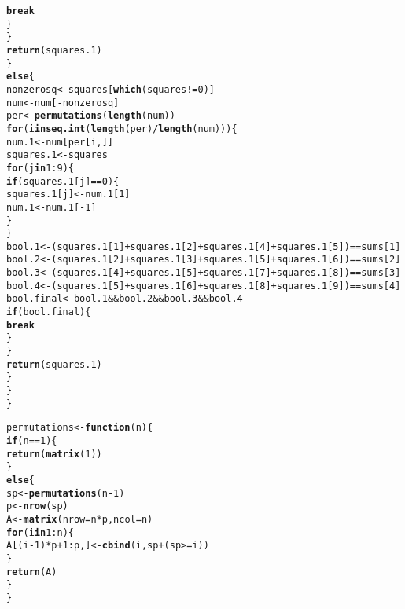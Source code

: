 \documentclass[12pt]{article}\usepackage[]{graphicx}\usepackage[]{color}
\makeatletter
\newcommand{\hlnum}[1]{\textcolor[rgb]{0.686,0.059,0.569}{#1}}%
\newcommand{\hlopt}[1]{\textcolor[rgb]{0,0,0}{#1}}%
\newcommand{\hlstd}[1]{\textcolor[rgb]{0.345,0.345,0.345}{#1}}%
\newcommand{\hlkwa}[1]{\textcolor[rgb]{0.161,0.373,0.58}{\textbf{#1}}}%
\newcommand{\hlkwb}[1]{\textcolor[rgb]{0.69,0.353,0.396}{#1}}%
\newcommand{\hlkwc}[1]{\textcolor[rgb]{0.333,0.667,0.333}{#1}}%
\newcommand{\hlkwd}[1]{\textcolor[rgb]{0.737,0.353,0.396}{\textbf{#1}}}%
\newenvironment{kframe}{%
 \def\at@end@of@kframe{}%
 \ifinner\ifhmode%
  \def\at@end@of@kframe{\end{minipage}}%
  \begin{minipage}{\columnwidth}%
 \fi\fi%
 \def\FrameCommand##1{\hskip\@totalleftmargin \hskip-\fboxsep
 \colorbox{shadecolor}{##1}\hskip-\fboxsep
     \hskip-\linewidth \hskip-\@totalleftmargin \hskip\columnwidth}%
 \MakeFramed {\advance\hsize-\width
   \@totalleftmargin\z@ \linewidth\hsize
   \@setminipage}}%
 {\par\unskip\endMakeFramed%
 \at@end@of@kframe}
\newenvironment{knitrout}{}{} %
\makeatother
\begin{document}
\begin{knitrout}
\begin{kframe}
\begin{alltt}
          \hlkwa{break}
        \hlstd{\}}
      \hlstd{\}}
      \hlkwd{return}\hlstd{(squares.1)}
    \hlstd{\}}
    \hlkwa{else}\hlstd{\{}
      \hlstd{nonzerosq} \hlkwb{<-} \hlstd{squares[}\hlkwd{which}\hlstd{(squares}\hlopt{!=}\hlnum{0}\hlstd{)]}
      \hlstd{num} \hlkwb{<-} \hlstd{num[}\hlopt{-}\hlstd{nonzerosq]}
      \hlstd{per} \hlkwb{<-} \hlkwd{permutations}\hlstd{(}\hlkwd{length}\hlstd{(num))}
      \hlkwa{for} \hlstd{(i} \hlkwa{in} \hlkwd{seq.int}\hlstd{(}\hlkwd{length}\hlstd{(per)}\hlopt{/}\hlkwd{length}\hlstd{(num)))\{}
        \hlstd{num.1} \hlkwb{<-} \hlstd{num[per[i,]]}
        \hlstd{squares.1} \hlkwb{<-} \hlstd{squares}
        \hlkwa{for} \hlstd{(j} \hlkwa{in} \hlnum{1}\hlopt{:}\hlnum{9}\hlstd{)\{}
          \hlkwa{if} \hlstd{(squares.1[j]}\hlopt{==}\hlnum{0}\hlstd{)\{}
            \hlstd{squares.1[j]} \hlkwb{<-} \hlstd{num.1[}\hlnum{1}\hlstd{]}
            \hlstd{num.1} \hlkwb{<-} \hlstd{num.1[}\hlopt{-}\hlnum{1}\hlstd{]}
          \hlstd{\}}
        \hlstd{\}}
        \hlstd{bool.1} \hlkwb{<-} \hlstd{(squares.1[}\hlnum{1}\hlstd{]}\hlopt{+}\hlstd{squares.1[}\hlnum{2}\hlstd{]}\hlopt{+}\hlstd{squares.1[}\hlnum{4}\hlstd{]}\hlopt{+}\hlstd{squares.1[}\hlnum{5}\hlstd{])}\hlopt{==}\hlstd{sums[}\hlnum{1}\hlstd{]}
        \hlstd{bool.2} \hlkwb{<-} \hlstd{(squares.1[}\hlnum{2}\hlstd{]}\hlopt{+}\hlstd{squares.1[}\hlnum{3}\hlstd{]}\hlopt{+}\hlstd{squares.1[}\hlnum{5}\hlstd{]}\hlopt{+}\hlstd{squares.1[}\hlnum{6}\hlstd{])}\hlopt{==}\hlstd{sums[}\hlnum{2}\hlstd{]}
        \hlstd{bool.3} \hlkwb{<-} \hlstd{(squares.1[}\hlnum{4}\hlstd{]}\hlopt{+}\hlstd{squares.1[}\hlnum{5}\hlstd{]}\hlopt{+}\hlstd{squares.1[}\hlnum{7}\hlstd{]}\hlopt{+}\hlstd{squares.1[}\hlnum{8}\hlstd{])}\hlopt{==}\hlstd{sums[}\hlnum{3}\hlstd{]}
        \hlstd{bool.4} \hlkwb{<-} \hlstd{(squares.1[}\hlnum{5}\hlstd{]}\hlopt{+}\hlstd{squares.1[}\hlnum{6}\hlstd{]}\hlopt{+}\hlstd{squares.1[}\hlnum{8}\hlstd{]}\hlopt{+}\hlstd{squares.1[}\hlnum{9}\hlstd{])}\hlopt{==}\hlstd{sums[}\hlnum{4}\hlstd{]}
        \hlstd{bool.final} \hlkwb{<-} \hlstd{bool.1}\hlopt{&&}\hlstd{bool.2}\hlopt{&&}\hlstd{bool.3}\hlopt{&&}\hlstd{bool.4}
        \hlkwa{if} \hlstd{(bool.final)\{}
          \hlkwa{break}
        \hlstd{\}}
      \hlstd{\}}
      \hlkwd{return}\hlstd{(squares.1)}
    \hlstd{\}}
  \hlstd{\}}
\hlstd{\}}


\hlstd{permutations} \hlkwb{<-} \hlkwa{function}\hlstd{(}\hlkwc{n}\hlstd{)\{}
  \hlkwa{if} \hlstd{(n}\hlopt{==}\hlnum{1}\hlstd{)\{}
    \hlkwd{return}\hlstd{(}\hlkwd{matrix}\hlstd{(}\hlnum{1}\hlstd{))}
  \hlstd{\}}
  \hlkwa{else}\hlstd{\{}
    \hlstd{sp} \hlkwb{<-} \hlkwd{permutations}\hlstd{(n}\hlopt{-}\hlnum{1}\hlstd{)}
    \hlstd{p} \hlkwb{<-} \hlkwd{nrow}\hlstd{(sp)}
    \hlstd{A} \hlkwb{<-}\hlkwd{matrix}\hlstd{(}\hlkwc{nrow}\hlstd{=n}\hlopt{*}\hlstd{p,} \hlkwc{ncol}\hlstd{=n)}
    \hlkwa{for} \hlstd{(i} \hlkwa{in} \hlnum{1}\hlopt{:}\hlstd{n)\{}
      \hlstd{A[(i}\hlopt{-}\hlnum{1}\hlstd{)}\hlopt{*}\hlstd{p}\hlopt{+}\hlnum{1}\hlopt{:}\hlstd{p,]} \hlkwb{<-} \hlkwd{cbind}\hlstd{(i, sp}\hlopt{+}\hlstd{(sp}\hlopt{>=}\hlstd{i))}
    \hlstd{\}}
    \hlkwd{return}\hlstd{(A)}
  \hlstd{\}}
\hlstd{\}}
\end{alltt}
\end{kframe}
\end{knitrout}
\end{document}
